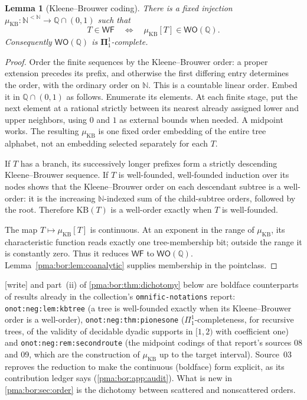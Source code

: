 \documentclass[11pt]{article}
\numberwithin{equation}{section}
\newtheorem{lemma}[lemma]{Lemma}
\theoremstyle{definition}
\theoremstyle{remark}
\newcommand{\N}{\mathbb N}
\newcommand{\Q}{\mathbb Q}
\newcommand{\WO}{\mathsf{WO}}
\newcommand{\WF}{\mathsf{WF}}
\newcommand{\muKB}{\mu_{\mathrm{KB}}}
\newcommand{\KB}{\mathrm{KB}}
\newcommand{\writetag}{\textup{\textsf{\small[write]}}}
\newcommand{\replabel}[1]{\nolinkurl{#1}}
\newcommand{\fn}[1]{\nolinkurl{#1}}
\begin{document}
\begin{lemma}[Kleene--Brouwer coding]
\label{pma:bor:lem:KB}
There is a fixed injection $\muKB:\N^{<\N}\to\Q\cap(0,1)$ such that
\[
 T\in\WF\quad\Longleftrightarrow\quad \muKB[T]\in\WO(\Q).
\]
Consequently $\WO(\Q)$ is $\boldsymbol\Pi^1_1$-complete.
\end{lemma}
\begin{proof}
Order the finite sequences by the Kleene--Brouwer order: a proper extension
precedes its prefix, and otherwise the first differing entry determines the
order, with the ordinary order on $\N$. This is a countable linear order.
Embed it in $\Q\cap(0,1)$ as follows. Enumerate its elements. At each finite
stage, put the next element at a rational strictly between its nearest
already assigned lower and upper neighbors, using $0$ and $1$ as external
bounds when needed. A midpoint works. The resulting $\muKB$ is one fixed order
embedding of the entire tree alphabet, not an embedding selected separately
for each $T$.

If $T$ has a branch, its successively longer prefixes form a strictly descending
Kleene--Brouwer sequence. If $T$ is well-founded, well-founded induction over
its nodes shows that the Kleene--Brouwer order on each descendant subtree is a
well-order: it is the increasing $\N$-indexed sum of the child-subtree orders,
followed by the root. Therefore $\KB(T)$ is a well-order exactly when $T$ is
well-founded.

The map $T\mapsto \muKB[T]$ is continuous. At an exponent in the range of $\muKB$,
its characteristic function reads exactly one tree-membership bit; outside
the range it is constantly zero. Thus it reduces $\WF$ to $\WO(\Q)$.
Lemma~\ref{pma:bor:lem:coanalytic} supplies membership in the pointclass.
\end{proof}

\noindent\writetag{}  and part~(ii) of
\cref{pma:bor:thm:dichotomy} below are boldface counterparts of results
already in the collection's \fn{omnific-notations} report:
\replabel{onot:neg:lem:kbtree} (a tree is well-founded exactly when its
Kleene--Brouwer order is a well-order), \replabel{onot:neg:thm:pionesone}
($\Pi^1_1$-completeness, for recursive trees, of the validity of decidable
dyadic supports in $[1,2)$ with coefficient one) and
\replabel{onot:neg:rem:secondroute} (the midpoint codings of that report's
sources 08 and 09, which are the construction of $\muKB$ up to the target
interval). Source~03 reproves the reduction to make the continuous
(boldface) form explicit, as its contribution ledger says
(\cref{pma:bor:app:audit}). What is new in \cref{pma:bor:sec:order} is the
dichotomy between scattered and nonscattered orders.
\end{document}
